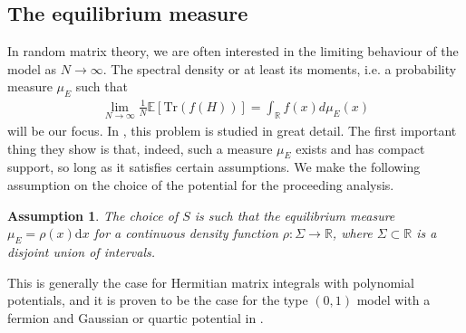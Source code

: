 \documentclass[10pt]{article}
\newcommand{\rr}{\mathbb{R}}
\newcommand{\dif}{\mathrm{d}}
\newcommand{\trace}[1]{\text{Tr}(#1)}
\theoremstyle{plain}
\theoremstyle{definition}
\theoremstyle{plain}
\newtheorem{assumption}{Assumption}
\begin{document}
\subsection{The equilibrium measure}
In random matrix theory, we are often interested in the limiting behaviour of the model as $N\to\infty$. The spectral density or at least its moments, i.e. a probability measure $\mu_E$ such that
\begin{align*}
	\lim_{N\to\infty}\frac{1}{N}\mathbb{E}[ \trace{f(H)}] = \int_\rr f(x)d\mu_E(x)
\end{align*}
will be our focus. 
In \cite{khalkhali2024large, verhoeven2023geometry}, this problem is studied in great detail. The first important thing they show is that, indeed, such a measure $\mu_E$ exists and has compact support, so long as it satisfies certain assumptions. We make the following assumption on the choice of the potential for the proceeding analysis.

\begin{assumption}
    The choice of $S$ is such that the equilibrium measure $\mu_E = \rho(x)\dif x$ for a continuous density function $\rho:\Sigma\to\rr$, where $\Sigma\subset \rr$ is a disjoint union of intervals.
\end{assumption} 

This is generally the case for Hermitian matrix integrals with polynomial potentials, and it is proven to be the case for the type $(0,1)$ model with a fermion and Gaussian or quartic potential in \cite{khalkhali2024large}.
 
\end{document}
